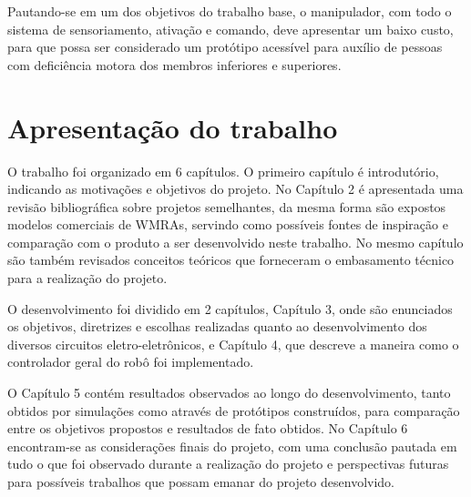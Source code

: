 Pautando-se em um dos objetivos do trabalho base, o manipulador, com 
todo o sistema de sensoriamento, ativação e comando, deve apresentar 
um baixo custo, para que possa ser considerado um protótipo acessível
para auxílio de pessoas com deficiência motora dos membros inferiores 
e superiores.


\section{Apresentação do trabalho}

O trabalho foi organizado em 6 capítulos. O primeiro capítulo é 
introdutório, indicando as motivações e objetivos do projeto. 
No Capítulo 2 é apresentada uma revisão bibliográfica sobre projetos
semelhantes, da mesma forma são expostos modelos comerciais de WMRAs, 
servindo como possíveis fontes de inspiração e comparação com o produto 
a ser desenvolvido neste trabalho. No mesmo capítulo são também revisados
conceitos teóricos que forneceram o embasamento técnico para a 
realização do projeto. 

O desenvolvimento foi dividido em 2 capítulos, Capítulo 3, onde
são enunciados os objetivos, diretrizes e escolhas realizadas quanto 
ao desenvolvimento dos diversos circuitos eletro-eletrônicos, e 
Capítulo 4, que descreve a maneira como o controlador geral do robô foi
implementado.

O Capítulo 5 contém resultados observados ao longo do desenvolvimento,
tanto obtidos por simulações como através de protótipos construídos, 
para comparação entre os objetivos propostos e resultados de fato obtidos.
No Capítulo 6 encontram-se as considerações finais do projeto, com 
uma conclusão pautada em tudo o que foi observado durante a realização
do projeto e perspectivas futuras para possíveis trabalhos que possam 
emanar do projeto desenvolvido. 